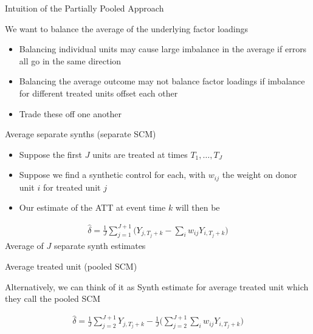 \documentclass{beamer}
\begin{document}
\begin{frame}{Intuition of the Partially Pooled Approach}

We want to balance the average of the underlying factor loadings

\begin{itemize}
\item Balancing individual units may cause large imbalance in the average if errors all go in the same direction
\item Balancing the average outcome may not balance factor loadings if imbalance for different treated units offset each other
\item Trade these off one another
\end{itemize}

\end{frame}



\begin{frame}{Average separate synths (separate SCM)}

\begin{itemize}
\item Suppose the first $J$ units are treated at times $T_1, \dots, T_J$
\item Suppose we find a synthetic control for each, with $w_{ij}$ the weight on donor unit $i$ for treated unit $j$
\item Our estimate of the ATT at event time $k$ will then be
\end{itemize}

\begin{eqnarray*}
\widehat{\delta} = \frac{1}{J} \sum_{j=1}^{J+1} \bigg ( Y_{j,T_j+k} - \sum_i w_{ij} Y_{i,T_j+k} \bigg )
\end{eqnarray*}Average of $J$ separate synth estimates

\end{frame}


\begin{frame}{Average treated unit (pooled SCM)}

Alternatively, we can think of it as Synth estimate for average treated unit which they call the pooled SCM

\begin{eqnarray*}
\widehat{\delta} = \frac{1}{J} \sum_{j=2}^{J+1} Y_{j,T_j+k} - \frac{1}{J} \bigg ( \sum_{j=2}^{J+1} \sum_i w_{ij} Y_{i,T_j+k} \bigg )
\end{eqnarray*}

\end{frame}
\end{document}
